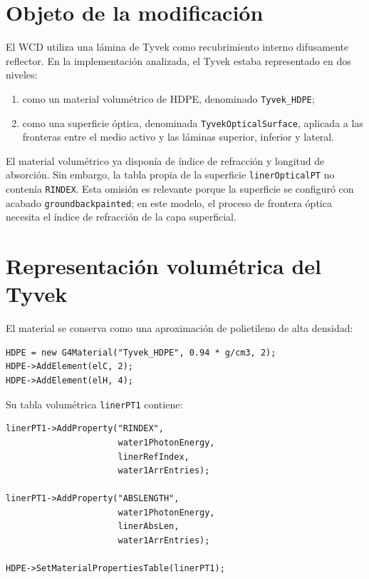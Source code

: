 \documentclass[11pt,a4paper]{article}
\newcommand{\codigo}[1]{\nolinkurl{#1}}
\begin{document}
\tableofcontents

\section{Objeto de la modificación}

El WCD utiliza una lámina de Tyvek como recubrimiento interno difusamente
reflector. En la implementación analizada, el Tyvek estaba representado en dos
niveles:

\begin{enumerate}
  \item como un material volumétrico de HDPE, denominado
  \codigo{Tyvek_HDPE};
  \item como una superficie óptica, denominada
  \codigo{TyvekOpticalSurface}, aplicada a las fronteras entre el medio activo
  y las láminas superior, inferior y lateral.
\end{enumerate}

El material volumétrico ya disponía de índice de refracción y longitud de
absorción. Sin embargo, la tabla propia de la superficie
\codigo{linerOpticalPT} no contenía \codigo{RINDEX}. Esta omisión es relevante
porque la superficie se configuró con acabado \codigo{groundbackpainted}; en
este modelo, el proceso de frontera óptica necesita el índice de refracción de
la capa superficial.

\section{Representación volumétrica del Tyvek}

El material se conserva como una aproximación de polietileno de alta densidad:

\begin{lstlisting}
HDPE = new G4Material("Tyvek_HDPE", 0.94 * g/cm3, 2);
HDPE->AddElement(elC, 2);
HDPE->AddElement(elH, 4);
\end{lstlisting}

Su tabla volumétrica \codigo{linerPT1} contiene:

\begin{lstlisting}
linerPT1->AddProperty("RINDEX",
                      water1PhotonEnergy,
                      linerRefIndex,
                      water1ArrEntries);

linerPT1->AddProperty("ABSLENGTH",
                      water1PhotonEnergy,
                      linerAbsLen,
                      water1ArrEntries);

HDPE->SetMaterialPropertiesTable(linerPT1);
\end{lstlisting}
\end{document}
